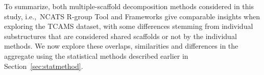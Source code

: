 \documentclass[journal=jacsat,manuscript=article]{achemso}
\newcommand*\fref[1]{Figure~\ref{fig:#1}}
\newcommand*\sref[1]{Section~\ref{sec:#1}}
\newcommand*\ie{i.e.,~}
\begin{document}
%


To summarize, both multiple-scaffold decomposition methods considered in this study, \ie NCATS R-group Tool and Frameworks give comparable insights when exploring the TCAMS dataset, with some differences stemming from individual substructures that are considered shared scaffolds or not by the individual methods.  We now explore these overlaps, similarities and differences in the aggregate using the statistical methods described earlier in \sref{statmethod}.
\end{document}

